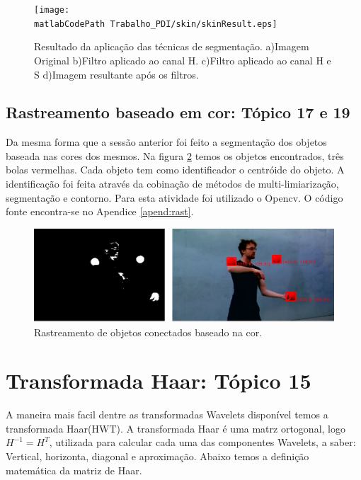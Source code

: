 \documentclass[
	article,			%
	11pt,				%
	oneside,			%
	a4paper,			%
	english,			%
	brazil,				%
	sumario=tradicional
	]{abntex2}
\newcommand{\matlabCodePath}{/home/clifte/git/Mestrado/Matlab/}
\begin{document}
\begin{figure} 
		\centering 
		\texttt{[image: \\matlabCodePath
		Trabalho\_PDI/skin/skinResult.eps]}
		\caption{Resultado da aplicação das técnicas de segmentação.
		a)Imagem Original
		b)Filtro aplicado ao canal H.
		c)Filtro aplicado ao canal H e S
		d)Imagem resultante após os filtros.
		}
		\label{fig:skinSegment}		
\end{figure}

\subsection{Rastreamento baseado em cor: Tópico 17 e 19}
Da mesma forma que a sessão anterior foi feito a segmentação dos objetos baseada
nas cores dos mesmos. Na figura \ref{fig:redBall} temos os objetos encontrados,
três bolas vermelhas. Cada objeto tem como identificador o centróide do objeto.
A identificação foi feita através da cobinação de métodos de multi-limiarização,
segmentação e contorno. Para esta atividade foi utilizado o Opencv. O código
fonte encontra-se no Apendice \ref{apend:rast}.



\begin{figure} 
		\centering 
		\includegraphics[width=\textwidth,scale=1, trim =
		4cm 0cm 0cm 1cm,clip]{imagens/track/redBall.png}
		\caption{Rastreamento de objetos conectados baseado na cor.
		}
		\label{fig:redBall}		
\end{figure}



\section{Transformada Haar: Tópico 15}

A maneira mais facil dentre as transformadas Wavelets disponível temos a
transformada Haar(HWT).
A transformada Haar é uma matrz ortogonal, logo $H^{-1}=H^{T}$, utilizada para
calcular cada uma das componentes Wavelets, a saber: Vertical, horizonta,
diagonal e aproximação. Abaixo temos a definição matemática da matriz de Haar.
\end{document}
